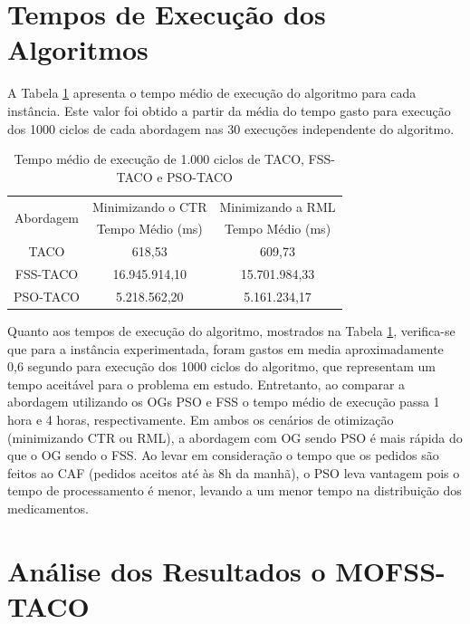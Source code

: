 \section{Tempos de Execução dos Algoritmos}
\label{sec-resultados-tempo}

A Tabela \ref{tab:resultado-tempo} apresenta o tempo médio de execução do algoritmo para cada instância. Este valor foi obtido a partir da média do tempo gasto para execução dos 1000 ciclos de cada abordagem nas 30 execuções independente do algoritmo.

\begin{table}[htb]
    \centering
    \caption{Tempo médio de execução de 1.000 ciclos de TACO, FSS-TACO e PSO-TACO} \label{tab:resultado-tempo}
    \begin{tabular}{|c|c|c|}
    \hline
    \multirow{2}{*}{Abordagem} & Minimizando o CTR & Minimizando a RML \\ \cline{2-3} 
                               & Tempo Médio (ms)  & Tempo Médio (ms)  \\ \hline
    TACO                       & 618,53            & 609,73            \\ \hline
    FSS-TACO                   & 16.945.914,10       & 15.701.984,33       \\ \hline
    PSO-TACO                   & 5.218.562,20        & 5.161.234,17        \\ \hline
    \end{tabular}
\end{table}

Quanto aos tempos de execução do algoritmo, mostrados na Tabela \ref{tab:resultado-tempo}, verifica-se que para a instância experimentada, foram gastos em media aproximadamente 0,6 segundo para execução dos 1000 ciclos do algoritmo, que representam um tempo aceitável para o problema em estudo. Entretanto, ao comparar a abordagem utilizando os OGs PSO e FSS o tempo médio de execução passa 1 hora e 4 horas, respectivamente. Em ambos os cenários de otimização (minimizando CTR ou RML), a abordagem com OG sendo PSO é mais rápida do que o OG sendo o FSS. Ao levar em consideração o tempo que os pedidos são feitos ao CAF (pedidos aceitos até às 8h da manhã), o PSO leva vantagem pois o tempo de processamento é menor, levando a um menor tempo na distribuição dos medicamentos.

\section{Análise dos Resultados o MOFSS-TACO}
\label{sec-resultados-tempo}


